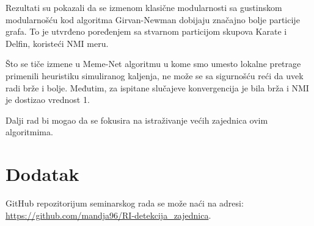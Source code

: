 \documentclass[a4paper]{article}
\begin{document}
Rezultati su pokazali da se izmenom klasične modularnosti sa gustinskom modularnošću kod algoritma Girvan-Newman dobijaju značajno bolje particije grafa. To je utvrđeno poređenjem sa stvarnom particijom skupova Karate i Delfin, koristeći NMI meru. 

Što se tiče izmene u Meme-Net algoritmu u kome smo umesto lokalne pretrage primenili heuristiku simuliranog kaljenja, ne može se sa sigurnošću reći da uvek radi brže i bolje. Međutim, za ispitane slučajeve konvergencija je bila brža i NMI je dostizao vrednost 1.

Dalji rad bi mogao da se fokusira na istraživanje većih zajednica ovim algoritmima.

\appendix
 


\appendix
\section{Dodatak}
GitHub repozitorijum seminarskog rada se može naći na adresi: \url{https://github.com/mandja96/RI-detekcija_zajednica}.
\end{document}
